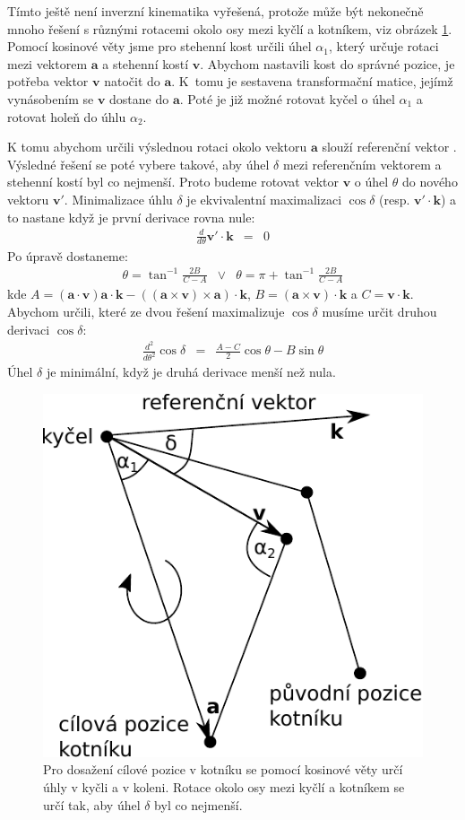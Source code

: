 Tímto ještě není inverzní kinematika vyřešená, protože může být nekonečně mnoho řešení s různými rotacemi okolo osy mezi kyčlí a kotníkem, viz obrázek \ref{fig:analytical_IK}. Pomocí kosinové věty jsme pro stehenní kost určili úhel $\alpha_1$, který určuje rotaci mezi vektorem $\mathbf{a}$ a stehenní kostí $\mathbf{v}$. Abychom nastavili kost do správné pozice, je potřeba vektor $\mathbf{v}$ natočit do $\mathbf{a}$. K~tomu je sestavena transformační matice, jejímž vynásobením se $\mathbf{v}$ dostane do $\mathbf{a}$. Poté je již možné rotovat kyčel o úhel $\alpha_1$ a rotovat holeň do úhlu $\alpha_2$. 

K tomu abychom určili výslednou rotaci okolo vektoru $\mathbf{a}$ slouží referenční vektor \cite{analytic_IK}. Výsledné řešení se poté vybere takové, aby úhel $\delta$ mezi referenčním vektorem a stehenní kostí byl co nejmenší. Proto budeme rotovat vektor $\mathbf{v}$ o úhel $\theta$ do nového vektoru $\mathbf{v}'$. Minimalizace úhlu $\delta$ je ekvivalentní maximalizaci $\cos\delta$ (resp. $\mathbf{v}'\cdot \mathbf{k}$) a to nastane když je první derivace rovna nule:
\begin{eqnarray}
\frac{d}{d\theta}\mathbf{v}'\cdot \mathbf{k} &=& 0
\label{r.IK_derivation}
\end{eqnarray}
Po úpravě dostaneme:
\begin{eqnarray}
\theta = \tan^{-1}\frac{2 B}{C-A} &\vee & \theta = \pi + \tan^{-1}\frac{2 B}{C-A}
\label{r.IK_derivation2}
\end{eqnarray}
kde $A = (\mathbf{a}\cdot \mathbf{v})\mathbf{a} \cdot \mathbf{k} - ((\mathbf{a} \times \mathbf{v})\times \mathbf{a})\cdot \mathbf{k}$, $B = (\mathbf{a} \times \mathbf{v})\cdot \mathbf{k}$ a $C = \mathbf{v}\cdot \mathbf{k}$. Abychom určili, které ze dvou řešení maximalizuje $\cos\delta$ musíme určit druhou derivaci $\cos\delta$:
\begin{eqnarray}
\frac{d^2}{d\theta^2}\cos\delta &=& \frac{A-C}{2} \cos\theta - B\sin\theta
\label{r.IK_derivation3}
\end{eqnarray}
Úhel $\delta$ je minimální, když je druhá derivace menší než nula.

\begin{figure}[h]
	\centering
	\includegraphics[width=0.4\linewidth]{fig/analytical_IK.pdf}
	\caption{Pro dosažení cílové pozice v kotníku se pomocí kosinové věty určí úhly v kyčli a v koleni. Rotace okolo osy mezi kyčlí a kotníkem se určí tak, aby úhel  $\delta$ byl co nejmenší.}
	\label{fig:analytical_IK}
\end{figure}

